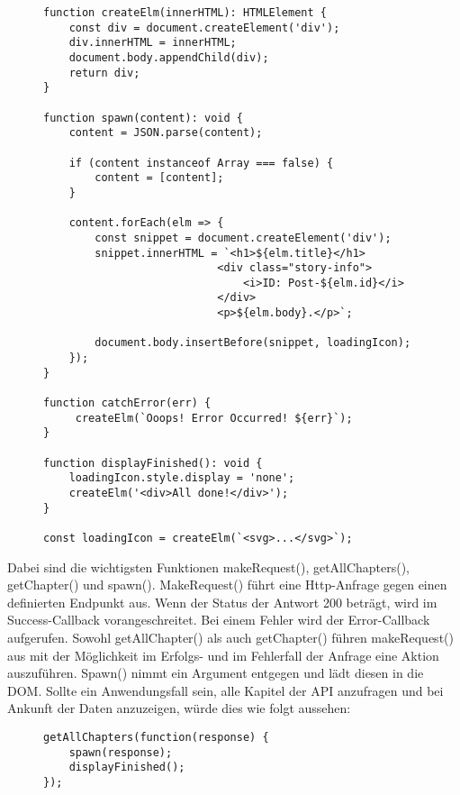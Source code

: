 \begin{figure}[H]
\begin{lstlisting}[basicstyle=\small]
function createElm(innerHTML): HTMLElement {
    const div = document.createElement('div');
    div.innerHTML = innerHTML;
    document.body.appendChild(div);
    return div;
}

function spawn(content): void {
    content = JSON.parse(content);

    if (content instanceof Array === false) {
        content = [content];
    }

    content.forEach(elm => {
        const snippet = document.createElement('div');
        snippet.innerHTML = `<h1>${elm.title}</h1>
                           <div class="story-info">
                               <i>ID: Post-${elm.id}</i>
                           </div>
                           <p>${elm.body}.</p>`;

        document.body.insertBefore(snippet, loadingIcon);
    });
}

function catchError(err) {
     createElm(`Ooops! Error Occurred! ${err}`);
}

function displayFinished(): void {
    loadingIcon.style.display = 'none';
    createElm('<div>All done!</div>');
}

const loadingIcon = createElm(`<svg>...</svg>`);
\end{lstlisting}
\end{figure}

\noindent
Dabei sind die wichtigsten Funktionen makeRequest(), getAllChapters(), getChapter() und spawn(). MakeRequest() führt eine Http-Anfrage gegen einen definierten Endpunkt aus. Wenn der Status der Antwort 200 beträgt, wird im Success-Callback vorangeschreitet. Bei einem Fehler wird der Error-Callback aufgerufen. Sowohl getAllChapter() als auch getChapter() führen makeRequest() aus mit der Möglichkeit im Erfolgs- und im Fehlerfall der Anfrage eine Aktion auszuführen. Spawn() nimmt ein Argument entgegen und lädt diesen in die DOM. Sollte ein Anwendungsfall sein, alle Kapitel der API anzufragen und bei Ankunft der Daten anzuzeigen, würde dies wie folgt aussehen:

\begin{figure}[H]
\begin{lstlisting}[basicstyle=\small]
getAllChapters(function(response) {
    spawn(response);
    displayFinished();
});
\end{lstlisting}
\end{figure}

